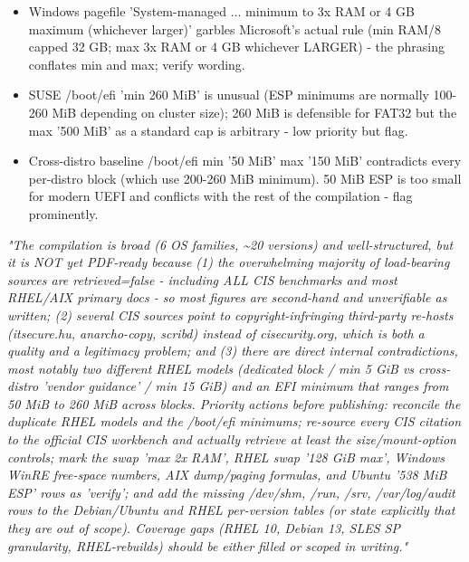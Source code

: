 \documentclass[10pt,a4paper]{article}
\begin{document}
\begin{itemize}[leftmargin=1.6em]
\item Windows pagefile 'System-managed ... minimum to 3x RAM or 4 GB maximum (whichever larger)' garbles Microsoft's actual rule (min RAM/8 capped 32 GB; max 3x RAM or 4 GB whichever LARGER) - the phrasing conflates min and max; verify wording.
\item SUSE /boot/efi 'min 260 MiB' is unusual (ESP minimums are normally 100-260 MiB depending on cluster size); 260 MiB is defensible for FAT32 but the max '500 MiB' as a standard cap is arbitrary - low priority but flag.
\item Cross-distro baseline /boot/efi min '50 MiB' max '150 MiB' contradicts every per-distro block (which use 200-260 MiB minimum). 50 MiB ESP is too small for modern UEFI and conflicts with the rest of the compilation - flag prominently.
\end{itemize}
\par\medskip\noindent\small\textit{"The compilation is broad (6 OS families, \textasciitilde{}20 versions) and well-structured, but it is NOT yet PDF-ready because (1) the overwhelming majority of load-bearing sources are retrieved=false - including ALL CIS benchmarks and most RHEL/AIX primary docs - so most figures are second-hand and unverifiable as written; (2) several CIS sources point to copyright-infringing third-party re-hosts (itsecure.hu, anarcho-copy, scribd) instead of cisecurity.org, which is both a quality and a legitimacy problem; and (3) there are direct internal contradictions, most notably two different RHEL models (dedicated block / min 5 GiB vs cross-distro 'vendor guidance' / min 15 GiB) and an EFI minimum that ranges from 50 MiB to 260 MiB across blocks. Priority actions before publishing: reconcile the duplicate RHEL models and the /boot/efi minimums; re-source every CIS citation to the official CIS workbench and actually retrieve at least the size/mount-option controls; mark the swap 'max 2x RAM', RHEL swap '128 GiB max', Windows WinRE free-space numbers, AIX dump/paging formulas, and Ubuntu '538 MiB ESP' rows as 'verify'; and add the missing /dev/shm, /run, /srv, /var/log/audit rows to the Debian/Ubuntu and RHEL per-version tables (or state explicitly that they are out of scope). Coverage gaps (RHEL 10, Debian 13, SLES SP granularity, RHEL-rebuilds) should be either filled or scoped in writing."}
\end{document}
